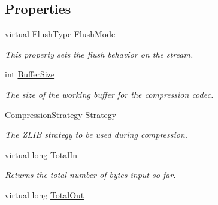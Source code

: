 \subsection*{Properties}
\begin{DoxyCompactItemize}
\item 
virtual \mbox{\hyperlink{namespace_super_tiled2_unity_1_1_ionic_1_1_zlib_a2c5853fd63f03c83ac2458da1f4ff3bc}{Flush\+Type}} \mbox{\hyperlink{class_super_tiled2_unity_1_1_ionic_1_1_zlib_1_1_deflate_stream_ab90435763dcf0b59cd239a55a59f9b39}{Flush\+Mode}}
\begin{DoxyCompactList}\small\item\em This property sets the flush behavior on the stream. \end{DoxyCompactList}\item 
int \mbox{\hyperlink{class_super_tiled2_unity_1_1_ionic_1_1_zlib_1_1_deflate_stream_a0555d2061a3aff3b2531cd3495cd9fe9}{Buffer\+Size}}
\begin{DoxyCompactList}\small\item\em The size of the working buffer for the compression codec. \end{DoxyCompactList}\item 
\mbox{\hyperlink{namespace_super_tiled2_unity_1_1_ionic_1_1_zlib_abde5c10a1e2ee453e1e8e22e79a39a3b}{Compression\+Strategy}} \mbox{\hyperlink{class_super_tiled2_unity_1_1_ionic_1_1_zlib_1_1_deflate_stream_a55241fe0bc77986941f432d1c53aa420}{Strategy}}
\begin{DoxyCompactList}\small\item\em The Z\+L\+IB strategy to be used during compression. \end{DoxyCompactList}\item 
virtual long \mbox{\hyperlink{class_super_tiled2_unity_1_1_ionic_1_1_zlib_1_1_deflate_stream_a4950384f71050fc0dfbc53e30880e660}{Total\+In}}
\begin{DoxyCompactList}\small\item\em Returns the total number of bytes input so far.\end{DoxyCompactList}\item 
virtual long \mbox{\hyperlink{class_super_tiled2_unity_1_1_ionic_1_1_zlib_1_1_deflate_stream_a0250472e27d63a58912c49c495b7d367}{Total\+Out}}

\end{DoxyCompactItemize}
